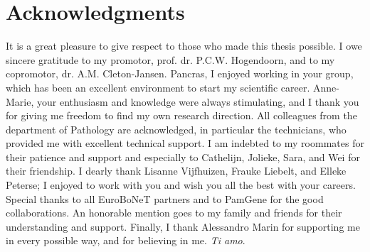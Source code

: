 \chapter{Acknowledgments}
It is a great pleasure to give respect to those who made this thesis possible. I owe sincere gratitude to my promotor, prof. dr. P.C.W. Hogendoorn, and to my copromotor, dr. A.M. Cleton-Jansen. Pancras, I enjoyed working in your group, which has been an excellent environment to start my scientific career. Anne-Marie, your enthusiasm and knowledge were always stimulating, and I thank you for giving me freedom to find my own research direction. All colleagues from the department of Pathology are acknowledged, in particular the technicians, who provided me with excellent technical support. I am indebted to my roommates for their patience and support and especially to Cathelijn, Jolieke, Sara, and Wei for their friendship. I dearly thank Lisanne Vijfhuizen, Frauke Liebelt, and Elleke Peterse; I enjoyed to work with you and wish you all the best with your careers. Special thanks to all EuroBoNeT partners and to PamGene for the good collaborations. An honorable mention goes to my family and friends for their understanding and support. Finally, I thank Alessandro Marin for supporting me in every possible way, and for believing in me. {\it Ti amo}.
\thispagestyle{empty}				%


